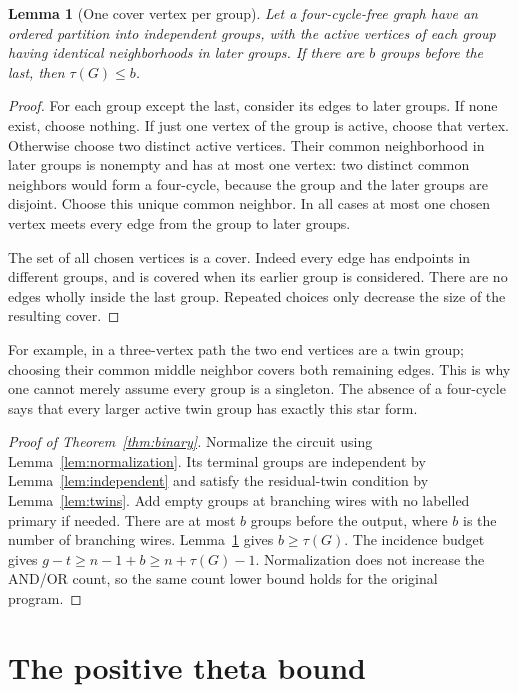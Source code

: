 \documentclass[11pt]{article}
\newtheorem{lemma}[theorem]{Lemma}
\theoremstyle{definition}
\theoremstyle{remark}
\begin{document}
\begin{lemma}[One cover vertex per group]\label{lem:cover}
Let a four-cycle-free graph have an ordered partition into independent
groups, with the active vertices of each group having identical
neighborhoods in later groups. If there are $b$ groups before the last,
then $\tau(G)\le b$.
\end{lemma}
\begin{proof}
For each group except the last, consider its edges to later groups.
If none exist, choose nothing. If just one vertex of the group is active,
choose that vertex. Otherwise choose two distinct active vertices. Their
common neighborhood in later groups is nonempty and has at most one
vertex: two distinct common neighbors would form a four-cycle, because
the group and the later groups are disjoint. Choose this unique common
neighbor. In all cases at most one chosen vertex meets every edge from
the group to later groups.

The set of all chosen vertices is a cover. Indeed every edge has endpoints
in different groups, and is covered when its earlier group is considered.
There are no edges wholly inside the last group. Repeated choices only
decrease the size of the resulting cover.
\end{proof}

For example, in a three-vertex path the two end vertices are a twin group;
choosing their common middle neighbor covers both remaining edges. This
is why one cannot merely assume every group is a singleton. The absence
of a four-cycle says that every larger active twin group has exactly this
star form.

\begin{proof}[Proof of Theorem~\ref{thm:binary}]
Normalize the circuit using Lemma~\ref{lem:normalization}. Its terminal
groups are independent by Lemma~\ref{lem:independent} and satisfy the
residual-twin condition by Lemma~\ref{lem:twins}. Add empty groups at
branching wires with no labelled primary if needed. There are at most
$b$ groups before the output, where $b$ is the number of branching wires.
Lemma~\ref{lem:cover} gives $b\ge\tau(G)$. The incidence budget gives
$g-t\ge n-1+b\ge n+\tau(G)-1$. Normalization does not increase the
AND/OR count, so the same count lower bound holds for the original program.
\end{proof}

\section{The positive theta bound}\label{sec:positive}
\end{document}
